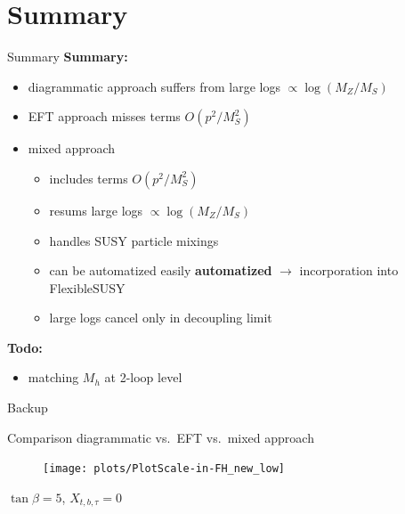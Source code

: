 \documentclass[hyperref={pdfpagelabels=false},ngerman]{beamer}
\renewcommand{\emph}{\textbf}
\begin{document}

\section{Summary}

\begin{frame}{Summary}
  \emph{Summary:}
  \begin{itemize}
  \item diagrammatic approach suffers from large logs $\propto\log(M_Z/M_S)$
  \item EFT approach misses terms $O(p^2/M_S^2)$
  \item mixed approach
    \begin{itemize}
    \item includes terms $O(p^2/M_S^2)$
    \item resums large logs $\propto\log(M_Z/M_S)$
    \item handles SUSY particle mixings
    \item can be automatized easily \emph{automatized} $\rightarrow$
      incorporation into FlexibleSUSY
    \item large logs cancel only in decoupling limit
    \end{itemize}
  \end{itemize}
  \emph{Todo:}
  \begin{itemize}
  \item matching $M_h$ at 2-loop level
  \end{itemize}
\end{frame}


\begin{frame}[noframenumbering]
  \begin{center}
    \Huge Backup
  \end{center}
\end{frame}

\begin{frame}{Comparison diagrammatic vs.\ EFT vs.\ mixed approach}
  \begin{figure}
    \centering
    \texttt{[image: plots/PlotScale-in-FH\_new\_low]}
  \end{figure}
  $\tan\beta = 5$, $X_{t,b,\tau} = 0$
\end{frame}
\end{document}
